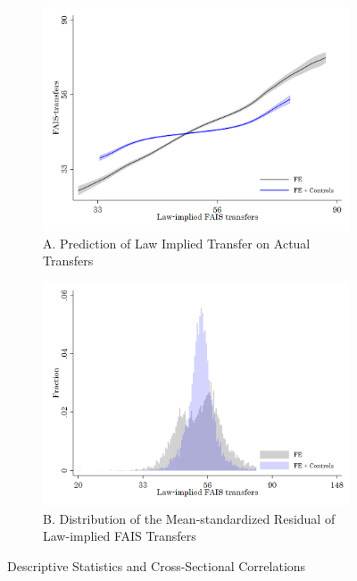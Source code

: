\documentclass[dv_diss_main.tex]{subfiles}
\begin{document}
\begin{figure}[H] 
	\centering 
	
	\begin{subfigure}[t]{0.67\textwidth} 
		\centering
		\includegraphics[width=\linewidth]{figures/First_Stage_G1_v2.png}
		\caption*{\footnotesize A. Prediction of Law Implied Transfer on Actual Transfers} 
	\end{subfigure} 
	\vspace{0.1cm}
	
	\begin{subfigure}[t]{0.67\textwidth} 
		\centering
		\includegraphics[width=\linewidth]{figures/First_Stage_G3_v2.png}
		\caption*{\footnotesize B. Distribution of the Mean-standardized Residual of Law-implied FAIS Transfers} 
	\end{subfigure}
	\caption{Descriptive Statistics and Cross-Sectional Correlations}\label{fig:des5}
\parbox{\textwidth}{\small 
	\vspace{2eX}
	\scriptsize	
	\firststage

}
\end{figure}
\end{document}
